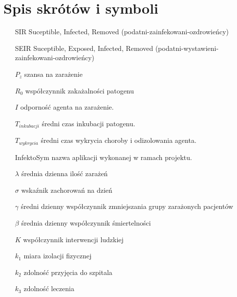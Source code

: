 \chapter{Spis skrótów i symboli}

\begin{itemize}
\item[SIR] Suceptible, Infected, Removed (podatni-zainfekowani-ozdrowieńcy)
\item[SEIR] Suceptible, Exposed, Infected, Removed (podatni-wystawieni-zainfekowani-ozdrowieńcy)
\item[$P_z$] szansa na zarażenie
\item[$R_0$] współczynnik zakażalności patogenu
\item[$I$] odporność agenta na zarażenie.
\item[$T_{inkubacji}$] średni czas inkubacji patogenu.
\item[$T_{wykrycia}$] średni czas wykrycia choroby i odizolowania agenta.
\item[InfektoSym] nazwa aplikacji wykonanej w ramach projektu.
\item[$\lambda$] średnia dzienna ilość zarażeń
\item[$\sigma$]wskaźnik zachorowań na dzień
\item [$\gamma$] średni dzienny współczynnik zmniejszania grupy zarażonych pacjentów
\item [$\beta$] średnia dzienny współczynnik śmiertelności
\item  [$K$] współczynnik interwencji ludzkiej
 \item [$k_1$] miara izolacji fizycznej
 \item [$k_2$] zdolność przyjęcia do szpitala
 \item [$k_3$] zdolność leczenia
\end{itemize}